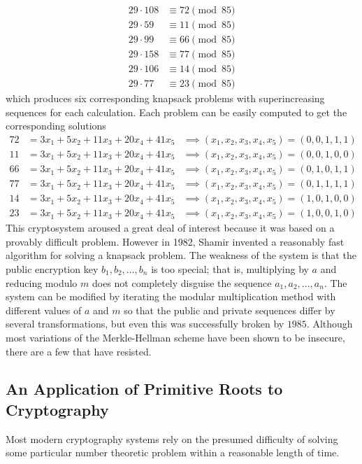 \documentclass{article}
\begin{document}
\begin{align*}
    29 \cdot 108 & \equiv 72 \pmod{85} \\
    29 \cdot 59 & \equiv 11 \pmod{85} \\
    29 \cdot 99 & \equiv 66 \pmod{85} \\
    29 \cdot 158 & \equiv 77 \pmod{85} \\
    29 \cdot 106 & \equiv 14 \pmod{85} \\
    29 \cdot 77 & \equiv 23 \pmod{85}
\end{align*}
which produces six corresponding knapsack problems with superincreasing sequences for each calculation. Each problem can be easily computed to get the corresponding solutions
\begin{align*}
    72 & = 3x_1 + 5x_2 + 11x_3 + 20x_4 + 41x_5 & \implies (x_1, x_2, x_3, x_4, x_5) = (0,0,1,1,1) \\
    11 & = 3x_1 + 5x_2 + 11x_3 + 20x_4 + 41x_5 & \implies (x_1, x_2, x_3, x_4, x_5) = (0,0,1,0,0) \\
    66 & = 3x_1 + 5x_2 + 11x_3 + 20x_4 + 41x_5 & \implies (x_1, x_2, x_3, x_4, x_5) = (0,1,0,1,1) \\
    77 & = 3x_1 + 5x_2 + 11x_3 + 20x_4 + 41x_5 & \implies (x_1, x_2, x_3, x_4, x_5) = (0,1,1,1,1) \\
    14 & = 3x_1 + 5x_2 + 11x_3 + 20x_4 + 41x_5 & \implies (x_1, x_2, x_3, x_4, x_5) = (1,0,1,0,0) \\
    23 & = 3x_1 + 5x_2 + 11x_3 + 20x_4 + 41x_5& \implies (x_1, x_2, x_3, x_4, x_5) = (1,0,0,1,0) 
\end{align*}
This cryptosystem aroused a great deal of interest because it was based on a provably difficult problem. However in 1982, Shamir invented a reasonably fast algorithm for solving a knapsack problem. The weakness of the system is that the public encryption key $b_1, b_2, ..., b_n$ is too special; that is, multiplying by $a$ and reducing modulo $m$ does not completely disguise the sequence $a_1, a_2, ..., a_n$. The system can be modified by iterating the modular multiplication method with different values of $a$ and $m$ so that the public and private sequences differ by several transformations, but even this was successfully broken by $1985$. Although most variations of the Merkle-Hellman scheme have been shown to be insecure, there are a few that have resisted. 

\subsection{An Application of Primitive Roots to Cryptography}
Most modern cryptography systems rely on the presumed difficulty of solving some particular number theoretic problem within a reasonable length of time. 
\end{document}
